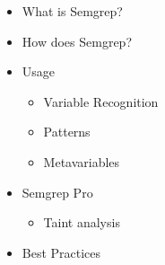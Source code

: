 \documentclass[preview]{standalone}
\begin{document}
\begin{center}
\begin{itemize}
                      \item What is Semgrep?
                      \item How does Semgrep?
                      \item Usage
                      \begin{itemize}
                      \item Variable Recognition
                      \item Patterns
                      \item Metavariables
                      \end{itemize}
                      \item Semgrep Pro
                      \begin{itemize}
                      \item Taint analysis
                      \end{itemize}
                      \item Best Practices
                      \end{itemize}
\end{center}
\end{document}
